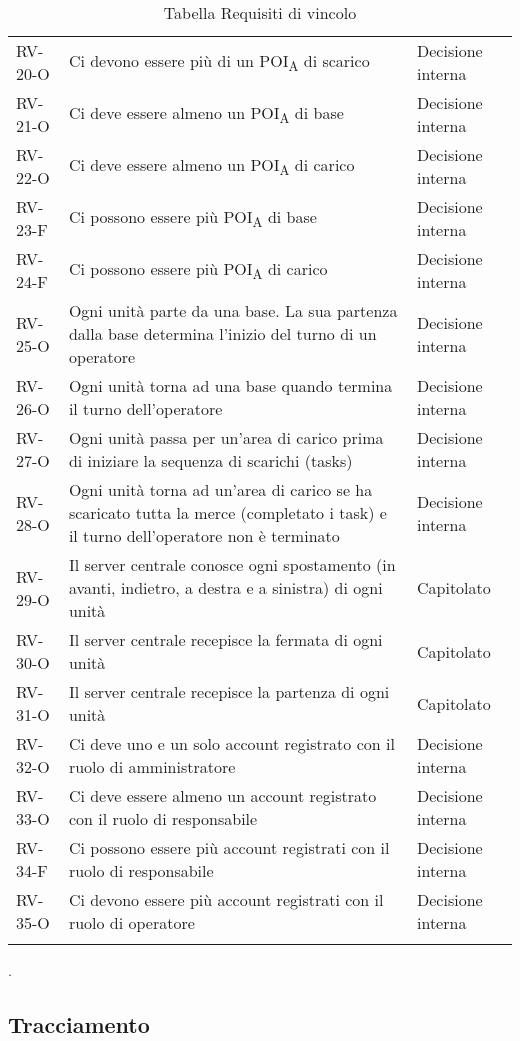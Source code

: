 \begin{longtable}{ 
		>{}p{} 
		>{}p{}
		>{\centering}p{} }
RV-20-O & Ci devono essere più di un \acrshort{POI}\textsubscript{A} di scarico & Decisione interna\tabularnewline
RV-21-O & Ci deve essere almeno un \acrshort{POI}\textsubscript{A} di base & Decisione interna\tabularnewline
RV-22-O & Ci deve essere almeno un \acrshort{POI}\textsubscript{A} di carico & Decisione interna\tabularnewline
RV-23-F & Ci possono essere più \acrshort{POI}\textsubscript{A} di base & Decisione interna\tabularnewline
RV-24-F & Ci possono essere più \acrshort{POI}\textsubscript{A} di carico & Decisione interna\tabularnewline
RV-25-O & Ogni unità parte da una base. La sua partenza dalla base determina l'inizio del turno di un operatore & Decisione interna\tabularnewline
RV-26-O & Ogni unità torna ad una base quando termina il turno dell'operatore & Decisione interna\tabularnewline
RV-27-O & Ogni unità passa per un'area di carico prima di iniziare la sequenza di scarichi (tasks) & Decisione interna\tabularnewline
RV-28-O & Ogni unità torna ad un'area di carico se ha scaricato tutta la merce (completato i task) e il turno dell'operatore non è terminato & Decisione interna\tabularnewline
RV-29-O & Il server centrale conosce ogni spostamento (in avanti, indietro, a destra e a sinistra) di ogni unità & Capitolato\tabularnewline
RV-30-O & Il server centrale recepisce la fermata di ogni unità & Capitolato\tabularnewline
RV-31-O & Il server centrale recepisce la partenza di ogni unità & Capitolato\tabularnewline
RV-32-O	&	Ci deve uno e un solo account registrato con il ruolo di amministratore	&	Decisione interna	\tabularnewline
RV-33-O	&	Ci deve essere almeno un account registrato con il ruolo di responsabile	&	Decisione interna	\tabularnewline
RV-34-F	&	Ci possono essere più account registrati con il ruolo di responsabile	&	Decisione interna	\tabularnewline
RV-35-O	&	Ci devono essere più account registrati con il ruolo di operatore	&	Decisione interna	\tabularnewline
\caption{Tabella Requisiti di vincolo\label{ Tabella Requisiti di vincolo}}
\end{longtable}.
\pagebreak
\subsection{Tracciamento}
